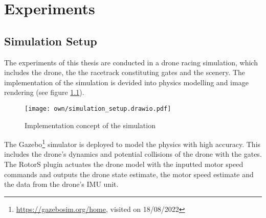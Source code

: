 \chapter{Experiments}
\label{maintwo}

\section{Simulation Setup}
The experiments of this thesis 
are conducted in a drone racing simulation,
which includes the drone,
the the racetrack constituting gates 
and the scenery.
The implementation of the simulation
is devided into physics modelling and image rendering
(see figure \ref{fig:simulation_setup}).
\begin{figure}[h]
    \centering
    \texttt{[image: own/simulation\_setup.drawio.pdf]}
    \caption[
        Implementation concept of the simulation
    ]{
        Implementation concept of the simulation
    \label{fig:simulation_setup}
    }
\end{figure}

The Gazebo\footnote{
    \url{https://gazebosim.org/home}, visited on 18/08/2022
} 
simulator is deployed to model the physics with high accuracy.
This includes the drone's dynamics and
potential collisions of the drone with the gates.
The RotorS \cite{Furrer2016} plugin
actuates the drone model with the inputted motor speed commands
and outputs the drone state estimate, the motor speed estimate and the data 
from the drone's IMU unit.

